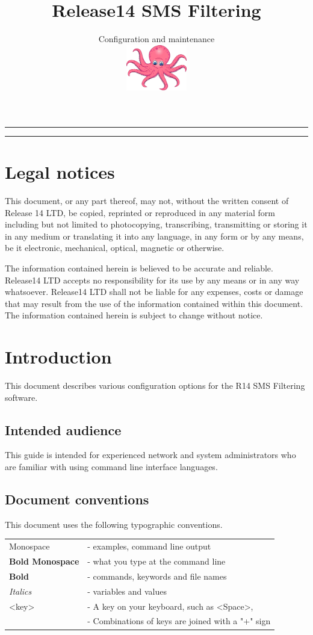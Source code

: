 \documentclass[a4paper,latin]{paper}
\title{Release14 SMS Filtering}
\subtitle{Configuration and maintenance\\
\hfill\includegraphics[height=2cm]{graphics/octopus.jpg}
\vspace{-1cm}}
\begin{document}
 
\pagestyle{fancy}
\onecolumn\maketitle 
\hrule 
\tableofcontents
\hrule\bigskip
\clearpage
\section{Legal notices}

This document, or any part thereof, may not, without the written consent of Release 14 LTD,
be copied, reprinted or reproduced in any material form including but not limited to
photocopying, transcribing, transmitting or storing it in any medium or translating it into any
language, in any form or by any means, be it electronic, mechanical, optical, magnetic or
otherwise.

The information contained herein is believed to be accurate and reliable. Release14 LTD
accepts no responsibility for its use by any means or in any way whatsoever. Release14 LTD
shall not be liable for any expenses, costs or damage that may result from the use of the
information contained within this document. The information contained herein is subject to
change without notice.

\section{Introduction}

This document describes various configuration options for the R14 SMS Filtering software.

\subsection{Intended audience}

This guide is intended for experienced network and system administrators who are familiar with
using command line interface languages.

\subsection{Document conventions}

This document uses the following typographic conventions.

\begin{tabular}{ l l }
Monospace & - examples, command line output \\
\textbf{Bold Monospace} & - what you type at the command line \\
\textbf{Bold} & - commands, keywords and file names \\
\textit{Italics} & - variables and values \\
\textless{}key\textgreater & - A key on your keyboard, such as \textless{}Space\textgreater, \\
& - Combinations of keys are joined with a "+" sign
\end{tabular}
\end{document}
